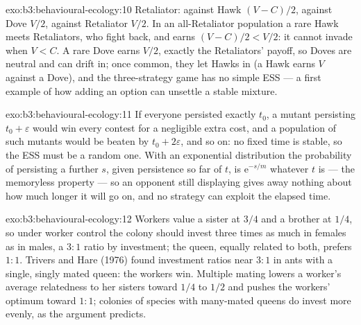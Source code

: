 \begin{solution}{exo:b3:behavioural-ecology:10}
Retaliator: against Hawk $(V - C)/2$, against Dove $V/2$, against
Retaliator $V/2$. In an all-Retaliator population a rare Hawk meets
Retaliators, who fight back, and earns $(V - C)/2 < V/2$: it cannot
invade when $V < C$. A rare Dove earns $V/2$, exactly the Retaliators'
payoff, so Doves are neutral and can drift in; once common, they let
Hawks in (a Hawk earns $V$ against a Dove), and the three-strategy game
has no simple ESS --- a first example of how adding an option can
unsettle a stable mixture.
\end{solution}

\begin{solution}{exo:b3:behavioural-ecology:11}
If everyone persisted exactly $t_{0}$, a mutant persisting $t_{0} +
\varepsilon$ would win every contest for a negligible extra cost, and a
population of such mutants would be beaten by $t_{0} + 2\varepsilon$, and
so on: no fixed time is stable, so the ESS must be a random one. With
an exponential distribution the probability of persisting a further
$s$, given persistence so far of $t$, is $\mathrm{e}^{-s/m}$ whatever $t$
is --- the memoryless property --- so an opponent still displaying gives
away nothing about how much longer it will go on, and no strategy can
exploit the elapsed time.
\end{solution}

\begin{solution}{exo:b3:behavioural-ecology:12}
Workers value a sister at $3/4$ and a brother at $1/4$, so under worker
control the colony should invest three times as much in females as in
males, a $3{:}1$ ratio by investment; the queen, equally related to both,
prefers $1{:}1$. Trivers and Hare (1976) found investment ratios near
$3{:}1$ in ants with a single, singly mated queen: the workers win.
Multiple mating lowers a worker's average relatedness to her sisters
toward $1/4$ to $1/2$ and pushes the workers' optimum toward $1{:}1$;
colonies of species with many-mated queens do invest more evenly, as
the argument predicts.
\end{solution}

